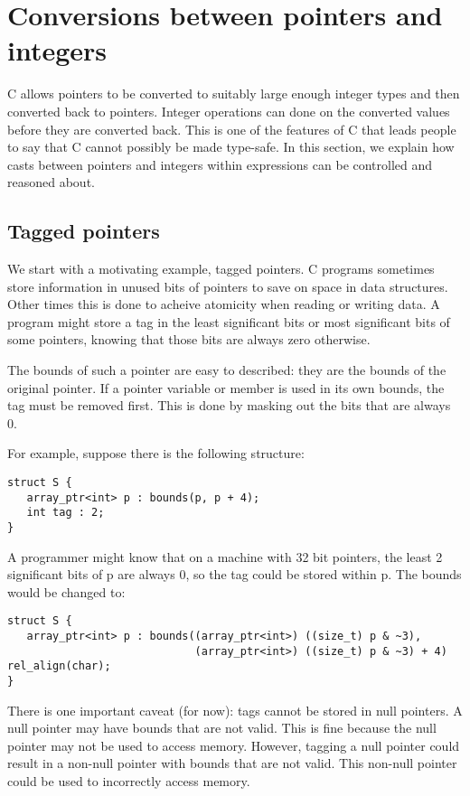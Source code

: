 \section{Conversions between pointers and integers}
\label{section:pointer-integer-conversions}

C allows pointers to be converted to suitably large enough integer
types and then converted back to pointers.  Integer operations can
done on the converted values before they are converted back.
This is one of the features of C that leads people to 
say that C cannot possibly be made type-safe.  In this section,
we explain how casts between pointers and integers within 
expressions can be controlled and reasoned about.

\subsection{Tagged pointers}
We start with a motivating example, tagged pointers.
C programs sometimes store information in unused bits of pointers
to save on space in data structures.  Other times this is done
to acheive atomicity when reading or writing data.  A
program might store a tag in the least significant bits or most
significant bits of some pointers, knowing that those bits are always
zero otherwise.

The bounds of such a pointer are easy to described: they are the bounds
of the original pointer. If a pointer variable or member is used in its
own bounds, the tag must be removed first. This is
done by masking out the bits that are always 0.

For example, suppose there is the following structure:

\begin{verbatim}
struct S {
   array_ptr<int> p : bounds(p, p + 4);
   int tag : 2;
}
\end{verbatim}

A programmer might know that on a machine with 32 bit pointers, the
least 2 significant bits of p are always 0, so the tag could be stored
within p. The bounds would be changed to:

\begin{verbatim}
struct S {
   array_ptr<int> p : bounds((array_ptr<int>) ((size_t) p & ~3), 
                             (array_ptr<int>) ((size_t) p & ~3) + 4) rel_align(char);
}
\end{verbatim}

There is one important caveat (for now): tags cannot be stored in null pointers. A
null pointer may have bounds that are not valid. This is fine because
the null pointer may not be used to access memory. However, tagging a
null pointer could result in a non-null pointer with bounds that are not
valid. This non-null pointer could be used to incorrectly access memory.

